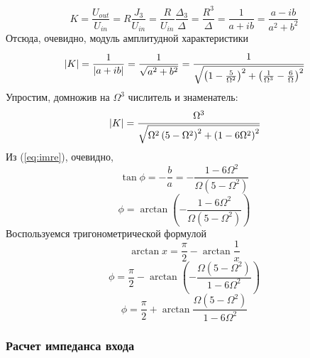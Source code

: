 \begin{equation}
	\label{eq:imre}
	K=\frac{U_{out}}{U_{in}}=R\frac{J_3}{U_{in}}=\frac{R}{U_{in}}\frac{\Delta_3}{\Delta}=\frac{R^3}{\Delta}=\frac{1}{a+ib}=\frac{a-ib}{a^2+b^2}
\end{equation}
Отсюда, очевидно, модуль амплитудной характеристики
\begin{equation}
	|K|=\frac{1}{|a+ib|}=\frac{1}{\sqrt{a^2+b^2}}
	=
	\cfrac{1}{
	\sqrt{
	\left(
		1
		-\frac{5}{\Omega^2}
	\right)^2
	+
	\left(
		\frac{1}{\Omega^3}
		-\frac{6}{\Omega}
	\right)^2	
	}}
\end{equation}
Упростим, домножив на $\Omega^3$ числитель и знаменатель:
\begin{equation}
	|K|=
	\cfrac{\Omega^3}{
	\sqrt{
	\Omega^2\left(
		5-\Omega^2
	\right)^2
	+
	\left(
		1
		-{6}{\Omega}^2
	\right)^2	
	}}
\end{equation}
Из (\ref{eq:imre}), очевидно,
\begin{equation}
	\tan\phi=-\frac{b}{a}=-\frac{1-6\Omega^2}{\Omega(5-\Omega^2)}
\end{equation}
\begin{equation}
	\phi=\arctan
	\left(
		-\frac{1-6\Omega^2}{\Omega(5-\Omega^2)}
	\right)
\end{equation}
Воспользуемся тригонометрической формулой
\begin{equation}
	\arctan x = \frac{\pi}{2}-\arctan\frac{1}{x}
\end{equation}
\begin{equation}
	\phi=\frac{\pi}{2}-\arctan(-\frac{\Omega(5-\Omega^2)}{1-6\Omega^2})
\end{equation}
\begin{equation}
	\phi=\frac{\pi}{2}+\arctan\frac{\Omega(5-\Omega^2)}{1-6\Omega^2}
\end{equation}

\subsubsection{Расчет импеданса входа}
    
